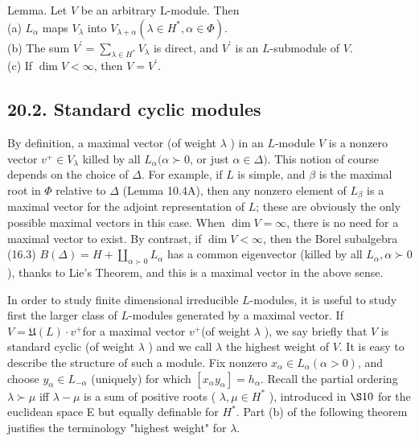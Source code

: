 \documentclass[10pt]{article}
\begin{document}
Lemma. Let $V$ be an arbitrary L-module. Then\\
(a) $L_{\alpha}$ maps $V_{\lambda}$ into $V_{\lambda+\alpha}\left(\lambda \in H^{*}, \alpha \in \Phi\right)$.\\
(b) The sum $V^{\prime}=\sum_{\lambda \in H^{*}} V_{\lambda}$ is direct, and $V^{\prime}$ is an $L$-submodule of $V$.\\
(c) If $\operatorname{dim} V<\infty$, then $V=V^{\prime}$.

\subsection*{20.2. Standard cyclic modules}
By definition, a maximal vector (of weight $\lambda$ ) in an $L$-module $V$ is a nonzero vector $v^{+} \in V_{\lambda}$ killed by all $L_{\alpha}(\alpha \succ 0$, or just $\alpha \in \Delta)$. This notion of course depends on the choice of $\Delta$. For example, if $L$ is simple, and $\beta$ is the maximal root in $\Phi$ relative to $\Delta$ (Lemma 10.4A), then any nonzero element of $L_{\beta}$ is a maximal vector for the adjoint representation of $L$; these are obviously the only possible maximal vectors in this case. When $\operatorname{dim} V=\infty$, there is no need for a maximal vector to exist. By contrast, if $\operatorname{dim} V<\infty$, then the Borel subalgebra (16.3) $B(\Delta)=H+\coprod_{\alpha \succ 0} L_{\alpha}$ has a common eigenvector (killed by all $L_{\alpha}, \alpha \succ 0$ ), thanks to Lie's Theorem, and this is a maximal vector in the above sense.

In order to study finite dimensional irreducible $L$-modules, it is useful to study first the larger class of $L$-modules generated by a maximal vector. If $V=\mathfrak{U}(L) \cdot v^{+}$for a maximal vector $v^{+}$(of weight $\lambda$ ), we say briefly that $V$ is standard cyclic (of weight $\lambda$ ) and we call $\lambda$ the highest weight of $V$. It is easy to describe the structure of such a module. Fix nonzero $x_{\alpha} \in L_{\alpha}(\alpha>0)$, and choose $y_{\alpha} \in L_{-\alpha}$ (uniquely) for which $\left[x_{\alpha} y_{\alpha}\right]=h_{\alpha}$. Recall the partial ordering $\lambda \succ \mu$ iff $\lambda-\mu$ is a sum of positive roots ( $\lambda, \mu \in H^{*}$ ), introduced in $\S 10$ for the euclidean space E but equally definable for $H^{*}$. Part (b) of the following theorem justifies the terminology "highest weight" for $\lambda$.
\end{document}

